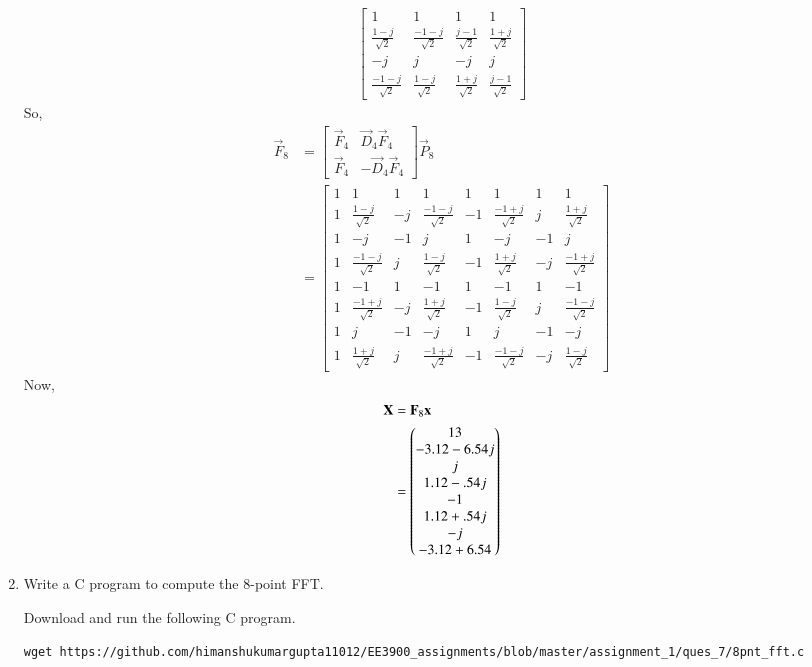 \documentclass[journal,12pt,twocolumn]{IEEEtran}
\renewcommand\thesection{\arabic{section}}
\begin{document}
\begin{enumerate}[label=\arabic*.,ref=\thesection.\theenumi]
\begin{align}
\begin{bmatrix}
	1&1&1&1\\
	\frac{1-j}{\sqrt{2}}&\frac{-1-j}{\sqrt{2}}&\frac{j-1}{\sqrt{2}}&\frac{1+j}{\sqrt{2}}\\
	-j&j&-j&j\\
	\frac{-1-j}{\sqrt{2}}&\frac{1-j}{\sqrt{2}}&\frac{1+j}{\sqrt{2}}&\frac{j-1}{\sqrt{2}}
\end{bmatrix}
\end{align}
So,
\begin{align}
	\vec{F}_8&=\begin{bmatrix}
		\vec{F}_{4}&\vec{D}_{4}\vec{F}_{4}\\
		\vec{F}_{4}&-\vec{D}_{4}\vec{F}_{4}
	\end{bmatrix}\vec{P}_8\\
&=\begin{bmatrix}
	1&1&1&1&1&1&1&1\\
	1&\frac{1-j}{\sqrt{2}}&-j&\frac{-1-j}{\sqrt{2}}&-1&\frac{-1+j}{\sqrt{2}}&j&\frac{1+j}{\sqrt{2}}\\
	1&-j&-1&j&1&-j&-1&j\\
	1&\frac{-1-j}{\sqrt{2}}&j&\frac{1-j}{\sqrt{2}}&-1&\frac{1+j}{\sqrt{2}}&-j&\frac{-1+j}{\sqrt{2}}\\
	1&-1&1&-1&1&-1&1&-1\\
	1&\frac{-1+j}{\sqrt{2}}&-j&\frac{1+j}{\sqrt{2}}&-1&\frac{1-j}{\sqrt{2}}&j&\frac{-1-j}{\sqrt{2}}\\
	1&j&-1&-j&1&j&-1&-j\\
	1&\frac{1+j}{\sqrt{2}}&j&\frac{-1+j}{\sqrt{2}}&-1&\frac{-1-j}{\sqrt{2}}&-j&\frac{1-j}{\sqrt{2}}
\end{bmatrix}
\end{align}
Now,
\begin{align}
	\mathbf{X}&=\mathbf{F}_8\mathbf{x}\\
	&=\begin{pmatrix}13\\-3.12-6.54j\\j\\1.12-.54j\\-1\\1.12+.54j\\-j\\-3.12+6.54\end{pmatrix}
\end{align}
	\item Write a C program to compute the 8-point FFT. 
	
	\solution Download and run the following C program.
	\begin{lstlisting}
wget https://github.com/himanshukumargupta11012/EE3900_assignments/blob/master/assignment_1/ques_7/8pnt_fft.c
	\end{lstlisting}
\end{enumerate}
\end{document}
